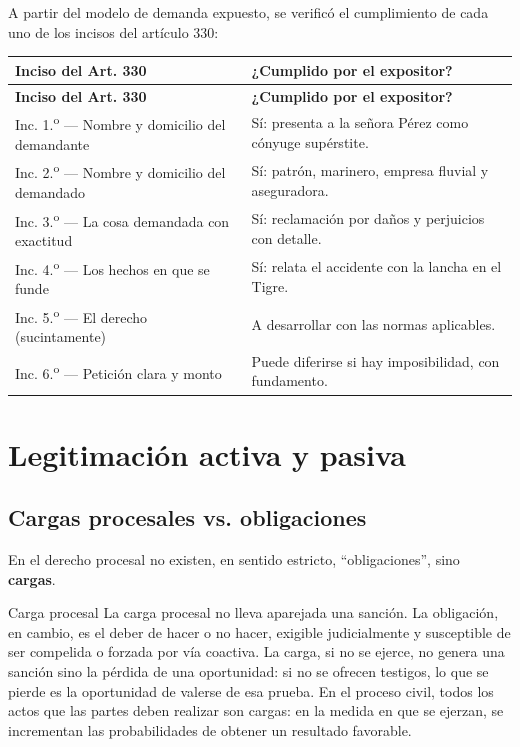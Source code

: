 \documentclass[12pt,oneside]{book}
\begin{document}
A partir del modelo de demanda expuesto, se verificó el cumplimiento de cada uno de los incisos del artículo 330:

\begin{longtable}{>{\raggedright\arraybackslash}p{} >{\raggedright\arraybackslash}p{}}
\toprule
\textbf{Inciso del Art. 330} & \textbf{¿Cumplido por el expositor?} \\
\midrule
\endfirsthead
\toprule
\textbf{Inciso del Art. 330} & \textbf{¿Cumplido por el expositor?} \\
\midrule
\endhead
Inc. 1.\textsuperscript{o} --- Nombre y domicilio del demandante & Sí: presenta a la señora Pérez como cónyuge supérstite. \\
Inc. 2.\textsuperscript{o} --- Nombre y domicilio del demandado & Sí: patrón, marinero, empresa fluvial y aseguradora. \\
Inc. 3.\textsuperscript{o} --- La cosa demandada con exactitud & Sí: reclamación por daños y perjuicios con detalle. \\
Inc. 4.\textsuperscript{o} --- Los hechos en que se funde & Sí: relata el accidente con la lancha en el Tigre. \\
Inc. 5.\textsuperscript{o} --- El derecho (sucintamente) & A desarrollar con las normas aplicables. \\
Inc. 6.\textsuperscript{o} --- Petición clara y monto & Puede diferirse si hay imposibilidad, con fundamento. \\
\bottomrule
\end{longtable}

\section{Legitimación activa y pasiva}

\subsection{Cargas procesales vs. obligaciones}

En el derecho procesal no existen, en sentido estricto, ``obligaciones'', sino \textbf{cargas}.

\begin{definition}{Carga procesal}
La carga procesal no lleva aparejada una sanción. La obligación, en cambio, es el deber de hacer o no hacer, exigible judicialmente y susceptible de ser compelida o forzada por vía coactiva. La carga, si no se ejerce, no genera una sanción sino la pérdida de una oportunidad: si no se ofrecen testigos, lo que se pierde es la oportunidad de valerse de esa prueba. En el proceso civil, todos los actos que las partes deben realizar son cargas: en la medida en que se ejerzan, se incrementan las probabilidades de obtener un resultado favorable.
\end{definition}
\end{document}
